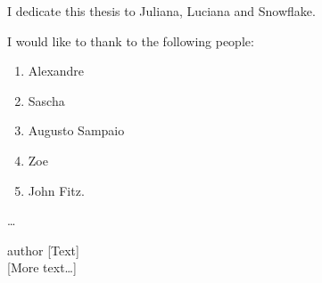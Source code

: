 \begin{dedicatory}
I dedicate this thesis to Juliana, Luciana and Snowflake.
\end{dedicatory}

\acknowledgements
I would like to thank to the following people:
\begin{enumerate}
  \item Alexandre
  \item Sascha
  \item Augusto Sampaio
  \item Zoe
  \item John Fitz.
\end{enumerate}
\ldots

\begin{epigraph}[title]{author}
[Text]\\
\vspace{0.5cm}
[More text\ldots]
\end{epigraph}